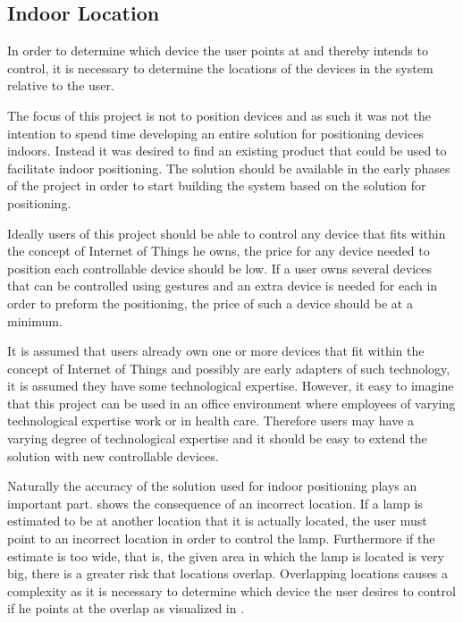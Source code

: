 \subsection{Indoor Location}\label{sec:designindoorlocation}
In order to determine which device the user points at and thereby intends to control, 
it is necessary to determine the locations of the devices in the system relative to the user.

The focus of this project is not to position devices and as such it was not the intention to spend time developing an entire solution for positioning devices indoors. 
Instead it was desired to find an existing product that could be used to facilitate indoor positioning.
The solution should be available in the early phases of the project in order to start building the system based on the solution for positioning.

Ideally users of this project should be able to control any device that fits within the concept of Internet of Things he owns, 
the price for any device needed to position each controllable device should be low. 
If a user owns several devices that can be controlled using gestures and an extra device is needed for each in order to preform the positioning, 
the price of such a device should be at a minimum.

It is assumed that users already own one or more devices that fit within the concept of Internet of Things and possibly are early adapters of such technology, 
it is assumed they have some technological expertise. 
However, it easy to imagine that this project can be used in an office environment where employees of varying technological expertise work or in health care. 
Therefore users may have a varying degree of technological expertise and it should be easy to extend the solution with new controllable devices.

Naturally the accuracy of the solution used for indoor positioning plays an important part. 
 shows the consequence of an incorrect location. 
If a lamp is estimated to be at another location that it is actually located, 
the user must point to an incorrect location in order to control the lamp.
Furthermore if the estimate is too wide, that is, the given area in which the lamp is located is very big, 
there is a greater risk that locations overlap. 
Overlapping locations causes a complexity as it is necessary to determine which device the user desires to control if he points at the overlap as visualized in .

